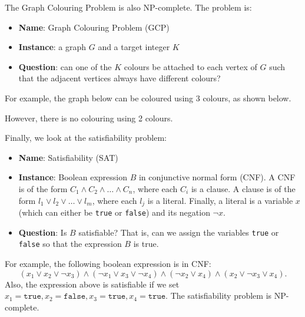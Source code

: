 \documentclass[a4paper, openany]{memoir}
\begin{document}
The Graph Colouring Problem is also NP-complete. The problem is:
\begin{itemize}
    \item \textbf{Name}: Graph Colouring Problem (GCP)
    \item \textbf{Instance}: a graph $G$ and a target integer $K$
    \item \textbf{Question}: can one of the $K$ colours be attached to each vertex of $G$ such that the adjacent vertices always have different colours?
\end{itemize}
For example, the graph below can be coloured using 3 colours, as shown below.
\begin{figure}[H]
    \centering
\end{figure}
\noindent However, there is no colouring using 2 colours.

Finally, we look at the satisfiability problem:
\begin{itemize}
    \item \textbf{Name}: Satisfiability (SAT)
    \item \textbf{Instance}: Boolean expression $B$ in conjunctive normal form (CNF). A CNF is of the form $C_1 \land C_2 \land \dots \land C_n$, where each $C_i$ is a clause. A clause is of the form $l_1 \lor l_2 \lor \dots \lor l_m$, where each $l_j$ is a literal. Finally, a literal is a variable $x$ (which can either be \texttt{true} or \texttt{false}) and its negation $\lnot x$.
    \item \textbf{Question}: Is $B$ satisfiable? That is, can we assign the variables \texttt{true} or \texttt{false} so that the expression $B$ is true.
\end{itemize}
For example, the following boolean expression is in CNF:
\[(x_1 \lor x_2 \lor \lnot x_3) \land (\lnot x_1 \lor x_3 \lor \lnot x_4) \land (\lnot x_2 \lor  x_4) \land (x_2 \lor \lnot x_3 \lor x_4).\]
Also, the expression above is satisfiable if we set $x_1 = \texttt{true}, x_2 = \texttt{false}, x_3 = \texttt{true}, x_4 = \texttt{true}$. The satisfiability problem is NP-complete.
\end{document}

